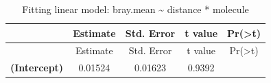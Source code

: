\documentclass[]{article}
\begin{document}
\begin{longtable}[]{@{}ccccc@{}}
\caption{Fitting linear model: bray.mean \textasciitilde{} distance *
molecule}\tabularnewline
\toprule
\begin{minipage}[b]{0.31\columnwidth}\centering\strut
~\strut
\end{minipage} & \begin{minipage}[b]{0.15\columnwidth}\centering\strut
Estimate\strut
\end{minipage} & \begin{minipage}[b]{0.15\columnwidth}\centering\strut
Std. Error\strut
\end{minipage} & \begin{minipage}[b]{0.12\columnwidth}\centering\strut
t value\strut
\end{minipage} & \begin{minipage}[b]{0.13\columnwidth}\centering\strut
Pr(\textgreater{}\textbar{}t\textbar{})\strut
\end{minipage}\tabularnewline
\midrule
\endfirsthead
\toprule
\begin{minipage}[b]{0.31\columnwidth}\centering\strut
~\strut
\end{minipage} & \begin{minipage}[b]{0.15\columnwidth}\centering\strut
Estimate\strut
\end{minipage} & \begin{minipage}[b]{0.15\columnwidth}\centering\strut
Std. Error\strut
\end{minipage} & \begin{minipage}[b]{0.12\columnwidth}\centering\strut
t value\strut
\end{minipage} & \begin{minipage}[b]{0.13\columnwidth}\centering\strut
Pr(\textgreater{}\textbar{}t\textbar{})\strut
\end{minipage}\tabularnewline
\midrule
\endhead
\begin{minipage}[t]{0.31\columnwidth}\centering\strut
\textbf{(Intercept)}\strut
\end{minipage} & \begin{minipage}[t]{0.15\columnwidth}\centering\strut
0.01524\strut
\end{minipage} & \begin{minipage}[t]{0.15\columnwidth}\centering\strut
0.01623\strut
\end{minipage} & \begin{minipage}[t]{0.12\columnwidth}\centering\strut
0.9392\strut
\end{minipage} & \begin{minipage}[t]{0.13\columnwidth}\centering\strut

\end{minipage}
\end{longtable}
\end{document}

